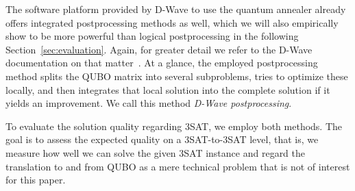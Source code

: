 The software platform provided by D-Wave to use the quantum annealer already offers integrated postprocessing methods as well, which we will also empirically show to be more powerful than logical postprocessing in the following Section~\ref{sec:evaluation}. Again, for greater detail we refer to the D-Wave documentation on that matter~\cite{dwavepostprocessing}. At a glance, the employed postprocessing method splits the QUBO matrix into several subproblems, tries to optimize these locally, and then integrates that local solution into the complete solution if it yields an improvement. We call this method \emph{D-Wave postprocessing}.

To evaluate the solution quality regarding 3SAT, we employ both methods. The goal is to assess the expected quality on a 3SAT-to-3SAT level, that is, we measure how well we can solve the given 3SAT instance and regard the translation to and from QUBO as a mere technical problem that is not of
interest for this paper.




